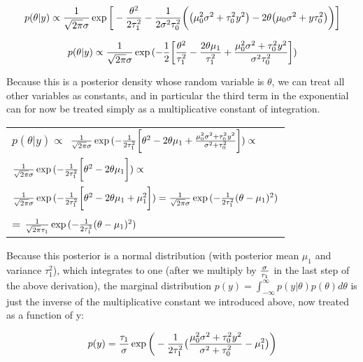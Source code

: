 \documentclass{article}
\begin{document}
 \[p(\theta \vert y) \propto  {1 \over \sqrt{2\pi}\sigma}
\exp{\bigg[-{\theta^2 \over 2 \tau_1^2} - {1 \over 2 \sigma^2 \tau_0^2} 
\bigg( \big(\mu_0^2\sigma^2 + \tau_0^2y^2\big) 
- 2\theta\big(\mu_0\sigma^2 + y\tau_0^2\big)
\bigg)\bigg]}\]

 \[p(\theta \vert y) \propto  {1 \over \sqrt{2\pi}\sigma}
\exp{(-{1 \over 2}\bigg[{\theta^2 \over \tau_1^2} - {2 \theta \mu_1 \over \tau_1^2} + 
{\mu_0^2\sigma^2 + \tau_0^2y^2 \over \sigma^2 \tau_0^2} 
\bigg])}\]

Because this is a posterior density whose random variable is \(\theta\),
we can treat all other variables as constants, and in particular the third
term in the exponential can for now be treated simply as a multiplicative constant
of integration.

\begin{flushleft}
\begin{tabular} {l}
 \( p(\theta \vert y) \propto\) 
\({1 \over \sqrt{2\pi}\sigma}\exp{(-{1 \over 2\tau_1^2}\bigg[\theta^2  - 2 \theta \mu_1 + 
{\mu_0^2\sigma^2 + \tau_0^2y^2 \over \sigma^2 + \tau_0^2} 
\bigg])} \propto\) \\
\({1 \over \sqrt{2\pi}\sigma} \exp{(-{1 \over 2\tau_1^2}\bigg[\theta^2  - 2 \theta \mu_1  
\bigg])} \propto \) \\
\({1 \over \sqrt{2\pi}\sigma}\exp{(-{1 \over 2\tau_1^2}\bigg[\theta^2  - 2 \theta \mu_1  
+ \mu_1^2 \bigg])} = {1 \over \sqrt{2\pi}\sigma} \exp{(-{1 \over 2\tau_1^2}(\theta - \mu_1)^2)}\) \\
= \({1 \over \sqrt{2\pi}\tau_1} \exp{(-{1 \over 2\tau_1^2}(\theta - \mu_1)^2)}\) \\
\end{tabular}
\end{flushleft}

Because this posterior is a normal distribution (with posterior mean \(\mu_1\) and variance \(\tau_1^2\)),
which integrates to one (after we multiply by \(\sigma \over \tau_1\) in the last step of the 
above derivation), the marginal distribution \(p(y) = \int^{\infty}_{-\infty}  p(y \vert \theta) p(\theta) d\theta\)
is just the inverse of the multiplicative constant we introduced above, now treated as a function of y:

\begin{equation}
p(y) = {\tau_1 \over \sigma}\exp{\bigg(-{1 \over 2\tau_1^2}\big({\mu_0^2\sigma^2 + \tau_0^2y^2 \over \sigma^2 + \tau_0^2} - \mu_1^2\big) \bigg)}
\end{equation}
\end{document}
